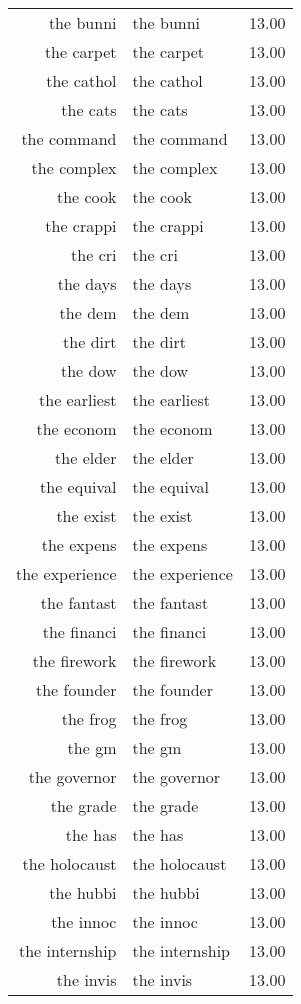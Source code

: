 \begin{table}[ht]
\begin{tabular}{rlr}
  the bunni & the bunni & 13.00 \\ 
  the carpet & the carpet & 13.00 \\ 
  the cathol & the cathol & 13.00 \\ 
  the cats & the cats & 13.00 \\ 
  the command & the command & 13.00 \\ 
  the complex & the complex & 13.00 \\ 
  the cook & the cook & 13.00 \\ 
  the crappi & the crappi & 13.00 \\ 
  the cri & the cri & 13.00 \\ 
  the days & the days & 13.00 \\ 
  the dem & the dem & 13.00 \\ 
  the dirt & the dirt & 13.00 \\ 
  the dow & the dow & 13.00 \\ 
  the earliest & the earliest & 13.00 \\ 
  the econom & the econom & 13.00 \\ 
  the elder & the elder & 13.00 \\ 
  the equival & the equival & 13.00 \\ 
  the exist & the exist & 13.00 \\ 
  the expens & the expens & 13.00 \\ 
  the experience & the experience & 13.00 \\ 
  the fantast & the fantast & 13.00 \\ 
  the financi & the financi & 13.00 \\ 
  the firework & the firework & 13.00 \\ 
  the founder & the founder & 13.00 \\ 
  the frog & the frog & 13.00 \\ 
  the gm & the gm & 13.00 \\ 
  the governor & the governor & 13.00 \\ 
  the grade & the grade & 13.00 \\ 
  the has & the has & 13.00 \\ 
  the holocaust & the holocaust & 13.00 \\ 
  the hubbi & the hubbi & 13.00 \\ 
  the innoc & the innoc & 13.00 \\ 
  the internship & the internship & 13.00 \\ 
  the invis & the invis & 13.00 \\ 

\end{tabular}
\end{table}
